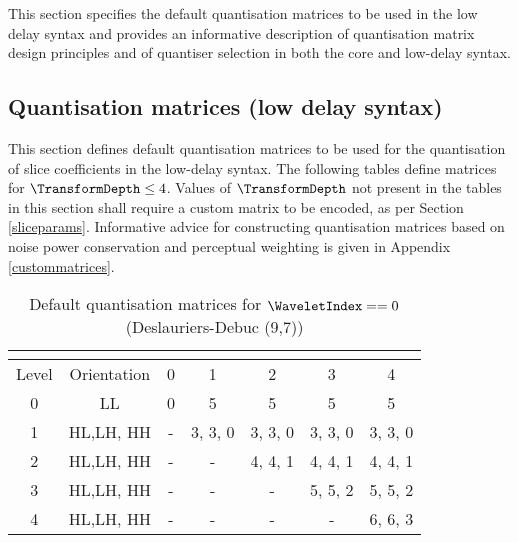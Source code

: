 \label{quantmatrices}

This section specifies the default quantisation matrices to be used
in the low delay syntax and provides an informative description of quantisation
matrix design principles and of quantiser selection in both the core
and low-delay syntax.

\subsection{Quantisation matrices (low delay syntax)}
\label{defaultquantmatrices}

This section defines default quantisation matrices to be used 
for the quantisation of slice coefficients in the low-delay syntax.
The following tables define matrices for $\TransformDepth\leq 4$. 
Values of $\TransformDepth$ not present in the tables
in this section shall require a custom matrix to be encoded, 
as per Section \ref{sliceparams}. Informative advice for 
constructing quantisation matrices based on noise power 
conservation and perceptual weighting is given in 
Appendix \ref{custommatrices}.

\begin{table}[!ht]
\centering
\begin{tabular}{|c|c|c|c|c|c|c|}
\hline
\multicolumn{2}{|c|}{\cellcolor[gray]{0.75}}& \multicolumn{5}{|c|}{\cellcolor[gray]{0.75}{$\TransformDepth$}} \\
\hline
Level & Orientation & 0 & 1 & 2 & 3 & 4 \\
\hline
0 & LL & 0 & 5 & 5 & 5 & 5\\
\hline
1 & HL,LH, HH & - & 3, 3, 0 & 3, 3, 0 & 3, 3, 0 & 3, 3, 0  \\
\hline
2 & HL,LH, HH & - & - & 4, 4, 1 & 4, 4, 1 & 4, 4, 1  \\
\hline
3 & HL,LH, HH & - & - & - & 5, 5, 2 & 5, 5, 2  \\
\hline
4 & HL,LH, HH & - & - & - & - & 6, 6, 3  \\
\hline
\end{tabular}
\caption{Default quantisation matrices for $\WaveletIndex==0$ (Deslauriers-Debuc (9,7)) 
\label{table:qm0}}
\end{table}

